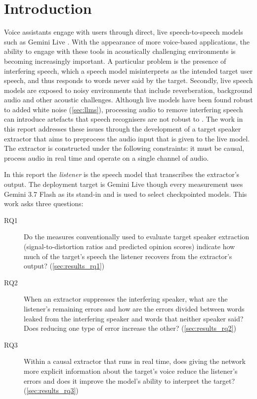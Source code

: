 \section{Introduction}
\label{sec:introduction}
Voice assistants engage with users through direct, live speech-to-speech models such as Gemini Live \cite{google2026geminilive}. With the appearance of more voice-based applications, the ability to engage with these tools in acoustically challenging environments is becoming increasingly important. A particular problem is the presence of interfering speech, which a speech model misinterprets as the intended target user speech, and thus responds to words never said by the target. Secondly, live speech models are exposed to noisy environments that include reverberation, background audio and other acoustic challenges. Although live models have been found robust to added white noise \cite{manakul2026audiojudge} (\autoref{sec:llms}), processing audio to remove interfering speech can introduce artefacts that speech recognisers are not robust to \cite{iwamoto2022bad,chondhekar2025denoising}. The work in this report addresses these issues through the development of a target speaker extractor \cite{zmolikova2023overview} that aims to preprocess the audio input that is given to the live model. The extractor is constructed under the following constraints: it must be causal, process audio in real time and operate on a single channel of audio. 

In this report the \emph{listener} is the speech model that transcribes the extractor's output. The deployment target is Gemini Live \cite{google2026geminilive} though every measurement uses Gemini 3.7 Flash \cite{google2026geminiflash} as its stand-in and is used to select checkpointed models. This work asks three questions:
  \begin{description}
    \item[RQ1] Do the measures conventionally used to evaluate target speaker extraction (signal-to-distortion ratios and predicted opinion scores) indicate how much of the target's speech the listener recovers from the extractor's output? (\autoref{sec:results_rq1})
    \item[RQ2] When an extractor suppresses the interfering speaker, what are the listener's remaining errors and how are the errors divided between words leaked from the interfering speaker and words that neither speaker said? Does reducing one type of error increase the other? (\autoref{sec:results_rq2})
    \item[RQ3] Within a causal extractor that runs in real time, does giving the network more explicit information about the target's voice reduce the listener's errors and does it improve the model's ability to interpret the target? (\autoref{sec:results_rq3})
  \end{description}

